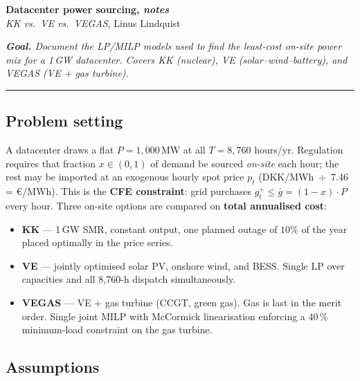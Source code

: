 \documentclass[10.5pt]{article}
\begin{document}
\thispagestyle{empty}

\begin{minipage}[c]{0.48\textwidth}
  {\LARGE\bf Datacenter power sourcing, \textit{notes}}\\[2pt]
  {\large \textit{KK vs.\ VE vs.\ VEGAS},} Linus Lindquist
\end{minipage}
\hfill
\begin{minipage}[c]{0.48\textwidth}
  \textit{\textbf{Goal.} Document the LP/MILP models used to find the least-cost
  on-site power mix for a 1\,GW datacenter. Covers KK (nuclear), VE
  (solar--wind--battery), and VEGAS (VE + gas turbine).}
\end{minipage}

\rule{\textwidth}{0.8pt}

\subsection*{Problem setting}

A datacenter draws a flat $P = 1{,}000$\,MW at all $T = 8{,}760$ hours/yr.
Regulation requires that fraction $x \in (0,1)$ of demand be sourced
\emph{on-site} each hour; the rest may be imported at an exogenous hourly spot
price $p_t$ (DKK/MWh~$\div$~7.46 = €/MWh). This is the \textbf{CFE
constraint}: grid purchases $g^+_t \leq \bar{g} = (1-x)\cdot P$ every hour.
Three on-site options are compared on \textbf{total annualised cost}:

\begin{itemize}[noitemsep,topsep=2pt]
  \item \textbf{KK} — 1\,GW SMR, constant output, one planned outage of $10\%$
        of the year placed optimally in the price series.
  \item \textbf{VE} — jointly optimised solar PV, onshore wind, and BESS.
        Single LP over capacities and all 8{,}760-h dispatch simultaneously.
  \item \textbf{VEGAS} — VE + gas turbine (CCGT, green gas). Gas is last in
        the merit order. Single joint MILP with McCormick linearisation enforcing
        a 40\,\% minimum-load constraint on the gas turbine.
\end{itemize}

\subsection*{Assumptions}
\end{document}
